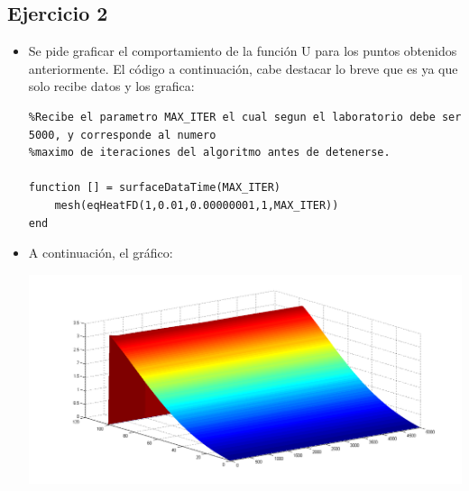 \documentclass[letter, 10pt]{article}
\begin{document}
\subsection{Ejercicio 2}
\begin{itemize}
\item Se pide graficar el comportamiento de la funci\'on U para los puntos obtenidos anteriormente. El c\'odigo a continuaci\'on, cabe destacar lo breve que es ya que solo recibe datos y los grafica:

\begin{lstlisting}
%Recibe el parametro MAX_ITER el cual segun el laboratorio debe ser 5000, y corresponde al numero
%maximo de iteraciones del algoritmo antes de detenerse.

function [] = surfaceDataTime(MAX_ITER)
	mesh(eqHeatFD(1,0.01,0.00000001,1,MAX_ITER))
end
\end{lstlisting} 

\item A continuaci\'on, el gr\'afico:

\begin{center}
\includegraphics[width=18cm]{grafico1.png}
\end{center}

\end{itemize}
\end{document}
